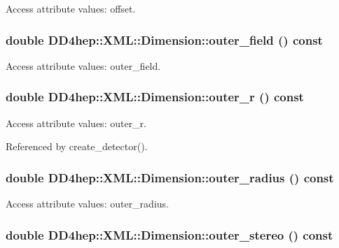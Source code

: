 Access attribute values: offset. \hypertarget{struct_d_d4hep_1_1_x_m_l_1_1_dimension_a99c51de131b70daaa0f38ce7c92adcd1}{
\subsubsection[{outer\_\-field}]{\setlength{\rightskip}{0pt plus 5cm}double DD4hep::XML::Dimension::outer\_\-field () const}}
\label{struct_d_d4hep_1_1_x_m_l_1_1_dimension_a99c51de131b70daaa0f38ce7c92adcd1}


Access attribute values: outer\_\-field. \hypertarget{struct_d_d4hep_1_1_x_m_l_1_1_dimension_ab2348b53888dc3d0e1c9afd956f37a61}{
\subsubsection[{outer\_\-r}]{\setlength{\rightskip}{0pt plus 5cm}double DD4hep::XML::Dimension::outer\_\-r () const}}
\label{struct_d_d4hep_1_1_x_m_l_1_1_dimension_ab2348b53888dc3d0e1c9afd956f37a61}


Access attribute values: outer\_\-r. 

Referenced by create\_\-detector().\hypertarget{struct_d_d4hep_1_1_x_m_l_1_1_dimension_a004fb16b87208f351d1a8a35fc641afe}{
\subsubsection[{outer\_\-radius}]{\setlength{\rightskip}{0pt plus 5cm}double DD4hep::XML::Dimension::outer\_\-radius () const}}
\label{struct_d_d4hep_1_1_x_m_l_1_1_dimension_a004fb16b87208f351d1a8a35fc641afe}


Access attribute values: outer\_\-radius. \hypertarget{struct_d_d4hep_1_1_x_m_l_1_1_dimension_aca3b0a91c8433347ee0f059c14b78f2c}{
\subsubsection[{outer\_\-stereo}]{\setlength{\rightskip}{0pt plus 5cm}double DD4hep::XML::Dimension::outer\_\-stereo () const}}
\label{struct_d_d4hep_1_1_x_m_l_1_1_dimension_aca3b0a91c8433347ee0f059c14b78f2c}


